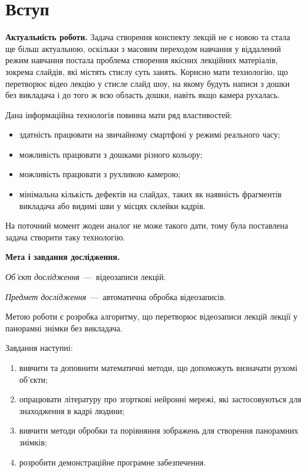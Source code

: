 \chapter*{Вступ}

\textbf{Актуальність роботи.}
Задача створення конспекту лекцій не є новою
та стала ще більш актуальною,
оскільки з масовим переходом навчання у віддалений режим навчання
постала проблема створення якісних
лекційних матеріалів, зокрема слайдів, які містять
стислу суть занять. Корисно мати технологію, що
перетворює відео лекцію у стисле слайд шоу, на
якому будуть написи з дошки без викладача і до того
ж всю область дошки, навіть якщо камера
рухалась. 

Дана інформаційна технологія повинна мати ряд властивостей:
\begin{itemize}
      \item здатність працювати на звичайному смартфоні у режимі реального часу;
      \item можливість працювати з дошками різного кольору;
      \item можливість працювати з рухливою камерою;
      \item мінімальна кількість дефектів на слайдах,
        таких як наявність фрагментів викладача
        або видимі шви у місцях склейки кадрів.
\end{itemize}
На поточний момент жоден аналог не може такого дати, тому була поставлена
задача створити таку технологію.

\textbf{Мета і завдання дослідження.}

\textit{Об'єкт дослідження}~---~відеозаписи лекцій.

\textit{Предмет дослідження}~---~автоматична обробка
відеозаписів.

Метою роботи є розробка алгоритму, що перетворює відеозаписи лекцій
лекції у панорамні знімки без викладача.

Завдання наступні:
\begin{enumerate}
      \item
            вивчити та доповнити математичні методи,
            що допоможуть визначати рухомі об'єкти;
      \item
            опрацювати літературу про згорткові нейронні мережі, які застосовуються
            для знаходження в кадрі людини;
      \item
            вивчити методи обробки та порівняння зображень для створення панорамних знімків;
      \item
            розробити демонстраційне програмне забезпечення.
\end{enumerate}

